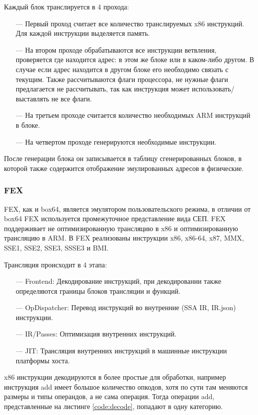 Каждый блок транслируется в 4 прохода:
\begin{itemize}[leftmargin=1.6\parindent]
	\item[---] Первый проход считает все количество транслируемых x86 инструкций. Для каждой инструкции выделяется память.
	\item[---] На втором проходе обрабатываются все инструкции ветвления, проверяется где находится адрес: в этом же блоке или в каком-либо другом. В случае если адрес находится в другом блоке его необходимо связать с текущим. Также рассчитываются флаги процессора, не нужные флаги предлагается не рассчитывать, так как инструкция может использовать/выставлять не все флаги.
	\item[---] На третьем проходе считается количество необходимых ARM инструкций в блоке.
	\item[---] На четвертом проходе генерируются необходимые инструкции.
\end{itemize}

После генерации блока он записывается в таблицу сгенерированных блоков, в которой также содержится отображение эмулированных адресов в физические. \cite{box64_wide}

\subsubsection{FEX}

FEX, как и box64, является эмулятором пользовательского режима, в отличии от box64 FEX используется промежуточное представление вида СЕП. FEX поддерживает не оптимизированную трансляцию в x86 и оптимизированную трансляцию в ARM. В FEX реализованы инструкции x86, x86-64, x87, MMX, SSE1, SSE2, SSE3, SSSE3 и BMI. 

Трансляция происходит в 4 этапа:

\begin{itemize}[leftmargin=1.6\parindent]
	\item[---] Frontend: Декодирование инструкций, при декодировании также определяются границы блоков трансляции и функций.
	\item[---] OpDispatcher: Перевод инструкций во внутренние (SSA IR, IR.json) инструкции.
	\item[---] IR/Passes: Оптимизация внутренних инструкций.
	\item[---] JIT: Трансляция внутренних инструкций в машинные инструкции платформы хоста.
\end{itemize}

x86 инструкции декодируются в более простые для обработки, например инструкция add имеет большое количество опкодов, хотя по сути там меняются размеры и типы операндов, а не сама операция. Тогда операции add, представленные на листинге \ref{code:decode}, попадают в одну категорию.

